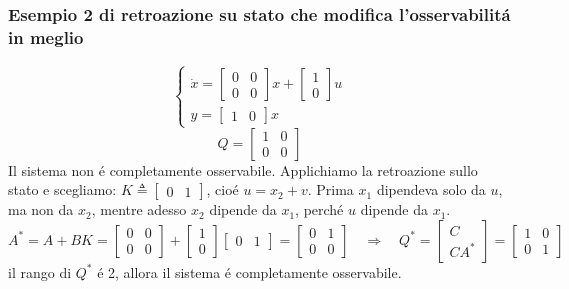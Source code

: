 \documentclass[../main.tex]{subfiles}
\begin{document}
	\subsubsection{Esempio 2 di retroazione su stato che modifica l'osservabilit\'a in meglio}
		\[
			\begin{cases}
				\dot x =
				\begin{bmatrix}
					0 & 0\\
					0 & 0
				\end{bmatrix} x+
				\begin{bmatrix}
					1\\
					0
				\end{bmatrix} u
				\\
				y = 
				\begin{bmatrix}
					1 & 0
				\end{bmatrix} x
			\end{cases}
		\]
		\[
			Q=
			\begin{bmatrix}
				1 & 0\\
				0 & 0
			\end{bmatrix}
		\]
		Il sistema non \'e completamente osservabile. Applichiamo la retroazione sullo stato e scegliamo: $ K \triangleq \left[ \begin{smallmatrix} 0 & 1 \end{smallmatrix} \right] $, cio\'e $ u = x_2 + v $. Prima $ x_1 $ dipendeva solo da $ u $, ma non da $ x_2 $, mentre adesso $ x_2 $ dipende da $ x_1 $, perch\'e $ u $ dipende da $ x_1 $.
		\[
			A^{*} = A+BK = 
			\begin{bmatrix}
				0 & 0\\
				0 & 0
			\end{bmatrix} + 
			\begin{bmatrix}
				1\\
				0
			\end{bmatrix}
			\begin{bmatrix}
				0 & 1
			\end{bmatrix} = 
			\begin{bmatrix}
				0 & 1\\
				0 & 0
			\end{bmatrix}
			\quad\Rightarrow\quad
			Q^{*} =
			\begin{bmatrix}
				C\\
				CA^{*}
			\end{bmatrix} =
			\begin{bmatrix}
				1 & 0\\
				0 & 1
			\end{bmatrix}
		\]
		il rango di $ Q^{*} $ \'e 2, allora il sistema \'e completamente osservabile.
		
\end{document}
